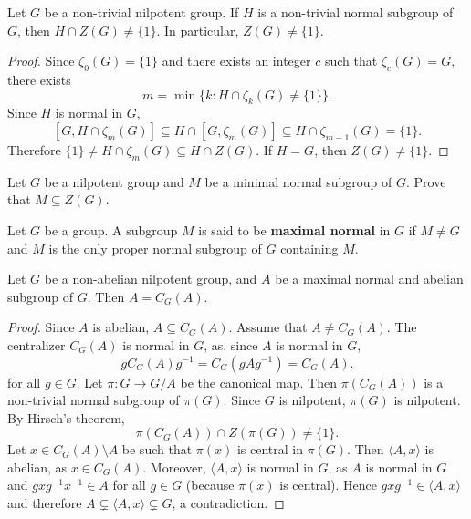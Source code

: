 \begin{theorem}[Hirsch]
\label{thm:Hirsch}
Let $G$ be a non-trivial nilpotent group. If $H$ is a non-trivial normal subgroup of $G$, 
then $H\cap Z(G)\ne\{1\}$. In particular, $Z(G)\ne\{1\}$. 
\end{theorem}

\begin{proof}
Since $\zeta_0(G)=\{1\}$ and there exists an integer $c$ such that $\zeta_c(G)=G$, 
there exists 
\[
m=\min\{k:H\cap\zeta_k(G)\ne\{1\}\}.
\]
Since $H$ is normal in $G$, 
\[
[G,H\cap\zeta_m(G)]\subseteq H\cap[G,\zeta_m(G)]\subseteq H\cap\zeta_{m-1}(G)=\{1\}.
\]
Therefore $\{1\}\ne H\cap\zeta_m(G)\subseteq H\cap Z(G)$. If $H=G$, then $Z(G)\ne\{1\}$. 
\end{proof}

\begin{exercise}
\label{xca:nilpotent_minimalnormal}
Let $G$ be a nilpotent group and $M$ be a minimal normal subgroup of $G$. Prove 
that $M\subseteq Z(G)$.
\end{exercise}


\begin{definition}
    Let $G$ be a group. A subgroup $M$ is said to be \textbf{maximal normal} in $G$
    if $M\ne G$ and $M$ is the only proper normal subgroup of $G$ containing $M$. 
\end{definition}

\begin{corollary}
Let $G$ be a non-abelian nilpotent group, and $A$ be a maximal normal and abelian 
subgroup of $G$. Then $A=C_G(A)$.
\end{corollary}

\begin{proof}
Since $A$ is abelian, $A\subseteq C_G(A)$. Assume that $A\ne C_G(A)$.
The centralizer $C_G(A)$ is normal in $G$, as, since $A$ is normal in $G$, 
\[
gC_G(A)g^{-1}=C_G(gAg^{-1})=C_G(A).
\]
for all $g\in G$. Let $\pi\colon G\to G/A$ be the canonical map. 
Then $\pi(C_G(A))$ is a non-trivial normal subgroup of $\pi(G)$. Since 
$G$ is nilpotent, $\pi(G)$ is nilpotent. By Hirsch's theorem, 
\[
\pi(C_G(A))\cap Z(\pi(G))\ne\{1\}.
\]
Let $x\in C_G(A)\setminus A$ be such that $\pi(x)$ is central in $\pi(G)$.  Then 
$\langle A,x\rangle$ is abelian, as $x\in C_G(A)$. Moreover,  $\langle
A,x\rangle$ is normal in $G$, as $A$ is normal in $G$ and 
$gxg^{-1}x^{-1}\in A$ for all  $g\in G$ (because $\pi(x)$ is central). Hence
	$gxg^{-1}\in \langle A,x\rangle$ and therefore $A\subsetneq \langle
	A,x\rangle\subsetneq G$, a contradiction.
\end{proof}

